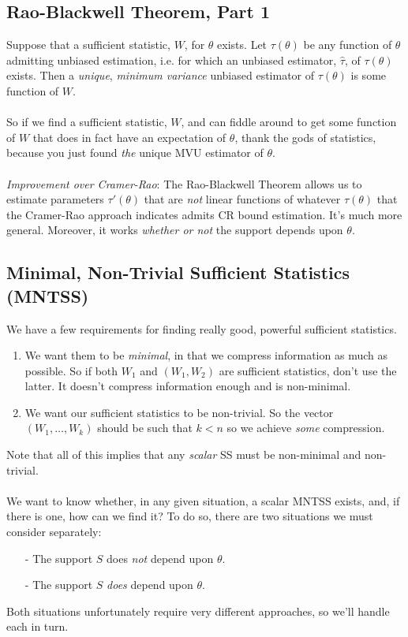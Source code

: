 \documentclass[a4paper,12pt]{scrartcl}
\begin{document}
\subsection{Rao-Blackwell Theorem, Part 1}

Suppose that a sufficient statistic, $W$, for $\theta$ exists.  Let
$\tau(\theta)$ be any function of $\theta$ admitting unbiased
estimation, i.e. for which an unbiased estimator, $\hat{\tau}$, of
$\tau(\theta)$ exists. Then a \emph{unique}, \emph{minimum variance}
unbiased estimator of $\tau(\theta)$ is some function of $W$.
\\
\\
So if we find a sufficient statistic, $W$, and can fiddle around to get
some function of $W$ that does in fact have an expectation of $\theta$,
thank the gods of statistics, because you just found \emph{the}
unique MVU estimator of $\theta$.
\\
\\
{\sl Improvement over Cramer-Rao}: The Rao-Blackwell Theorem
allows us to estimate parameters $\tau'(\theta)$ that are \emph{not}
linear functions of whatever $\tau(\theta)$ that the Cramer-Rao approach
indicates admits CR bound estimation. It's much
more general. Moreover, it works \emph{whether or not} the support
depends upon $\theta$.


\subsection{Minimal, Non-Trivial Sufficient Statistics (MNTSS)}

We have a few requirements for finding really good, powerful
sufficient statistics.
\begin{enumerate}
   \item We want them to be \emph{minimal}, in that we compress
      information as
      much as possible. So if both $W_1$ and $(W_1, W_2)$ are sufficient
      statistics, don't use the latter. It doesn't compress information
      enough and is non-minimal.
   \item We want our sufficient statistics to be non-trivial. So
      the vector $(W_1, \ldots, W_k)$ should be such that
      $k < n$ so we achieve \emph{some} compression.
\end{enumerate}
Note that all of this implies that any \emph{scalar} SS must be
non-minimal and non-trivial.
\\
\\
We want to know whether, in any given situation, a scalar MNTSS
exists, and, if there is one, how can we find it? To do so, there
are two situations we must consider separately:
\begin{itemize}
   \item[-] The support $S$ does \emph{not} depend upon $\theta$.
   \item[-] The support $S$ \emph{does} depend upon $\theta$.
\end{itemize}
Both situations unfortunately require very different approaches, so
we'll handle each in turn.
\end{document}
